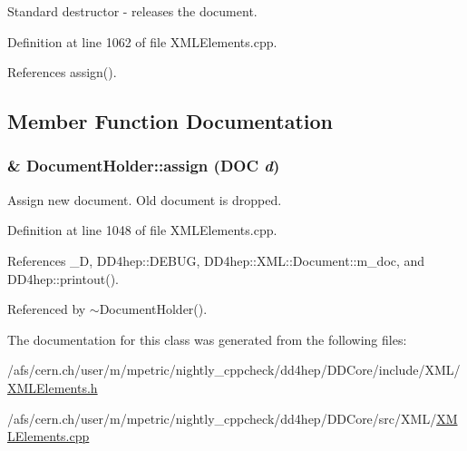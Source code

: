 Standard destructor -\/ releases the document. 

Definition at line 1062 of file XMLElements.cpp.

References assign().

\subsection{Member Function Documentation}
\hypertarget{class_d_d4hep_1_1_x_m_l_1_1_document_holder_ab71ec2747100221649d868aece161d1e}{
\subsubsection[{assign}]{ \& DocumentHolder::assign ({\bf DOC} {\em d})}}
\label{class_d_d4hep_1_1_x_m_l_1_1_document_holder_ab71ec2747100221649d868aece161d1e}


Assign new document. Old document is dropped. 

Definition at line 1048 of file XMLElements.cpp.

References \_\-D, DD4hep::DEBUG, DD4hep::XML::Document::m\_\-doc, and DD4hep::printout().

Referenced by $\sim$DocumentHolder().

The documentation for this class was generated from the following files:\begin{DoxyCompactItemize}
\item 
/afs/cern.ch/user/m/mpetric/nightly\_\-cppcheck/dd4hep/DDCore/include/XML/\hyperlink{_x_m_l_elements_8h}{XMLElements.h}\item 
/afs/cern.ch/user/m/mpetric/nightly\_\-cppcheck/dd4hep/DDCore/src/XML/\hyperlink{_x_m_l_elements_8cpp}{XMLElements.cpp}\end{DoxyCompactItemize}
